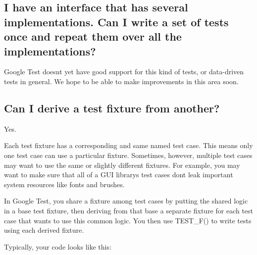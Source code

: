 \subsection*{I have an interface that has several implementations. Can I write a set of tests once and repeat them over all the implementations?}

Google Test doesn\textquotesingle{}t yet have good support for this kind of tests, or data-\/driven tests in general. We hope to be able to make improvements in this area soon.

\subsection*{Can I derive a test fixture from another?}

Yes.

Each test fixture has a corresponding and same named test case. This means only one test case can use a particular fixture. Sometimes, however, multiple test cases may want to use the same or slightly different fixtures. For example, you may want to make sure that all of a G\+UI library\textquotesingle{}s test cases don\textquotesingle{}t leak important system resources like fonts and brushes.

In Google Test, you share a fixture among test cases by putting the shared logic in a base test fixture, then deriving from that base a separate fixture for each test case that wants to use this common logic. You then use {\ttfamily T\+E\+S\+T\+\_\+\+F()} to write tests using each derived fixture.

Typically, your code looks like this\+:


\begin{DoxyCode}{0}
\DoxyCodeLine{\};}
\DoxyCodeLine{}
\DoxyCodeLine{    \}}
\DoxyCodeLine{    \}}
\DoxyCodeLine{\};}
\DoxyCodeLine{}
\DoxyCodeLine{}
\end{DoxyCode}


